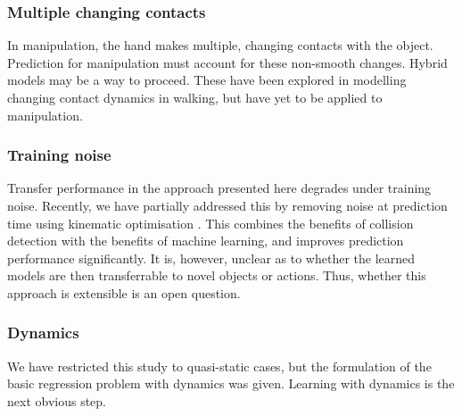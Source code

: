 \subsubsection{Multiple changing contacts}  In manipulation, the hand makes multiple, changing contacts with the object. Prediction for manipulation must account for these non-smooth changes. Hybrid models may be a way to proceed. These have been explored in modelling changing contact dynamics in walking, but have yet to be applied to manipulation.

\subsubsection{ Training noise} Transfer performance in the approach presented here degrades under training noise. Recently, we have partially addressed this by removing noise at prediction time using kinematic optimisation \cite{belter2014iros}. This combines the benefits of collision detection with the benefits of machine learning, and improves prediction performance significantly. It is, however, unclear as to whether the learned models are then transferrable to novel objects or actions. Thus, whether this approach is extensible is an open question. 

\subsubsection{Dynamics} We have restricted this study to quasi-static cases, but the formulation of the basic regression problem with dynamics was given. Learning with dynamics is the next obvious step. 



